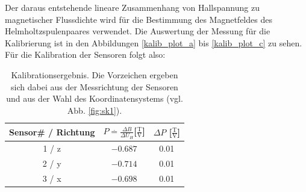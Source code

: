 \documentclass[12pt,a4paper]{article}
\begin{document}
Der daraus entstehende lineare Zusammenhang von Hallspannung zu magnetischer Flussdichte wird für die Bestimmung des Magnetfeldes des Helmholtzspulenpaares verwendet. Die Auswertung der Messung für die Kalibrierung ist in den Abbildungen \ref{kalib_plot_a} bis \ref{kalib_plot_c} zu sehen. Für die Kalibration der Sensoren folgt also:
\begin{table}[H]
	\centering
	\begin{tabular}{c|c|c}
	Sensor\# / Richtung	& $P\stackrel{.}{=}\frac{\Delta B}{\Delta U_H}$[$\frac{\text{T}}{\text{V}}$]  & $\Delta P$ [$\frac{\text{T}}{\text{V}}$] \\ \hline \hline
	1 / z	& $ -0.687$ & 0.01 \\ 
	2 / y	& $ -0.714$ &  0.01\\ 
	3 / x	& $ -0.698$ &  0.01\\ 
	\end{tabular} 
	\caption{Kalibrationsergebnis. Die Vorzeichen ergeben sich dabei aus der Messrichtung der Sensoren und aus der Wahl des Koordinatensystems (vgl. Abb. \ref{fig:sk1}).}
\end{table}
\end{document}
